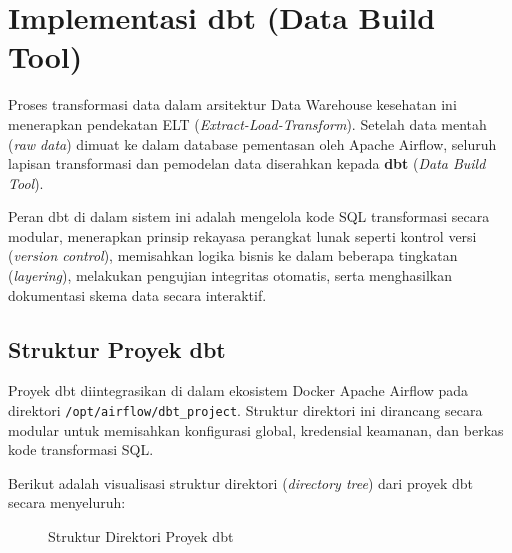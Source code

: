 
\chapter{Implementasi dbt (Data Build Tool)}
 
 
Proses transformasi data dalam arsitektur Data Warehouse kesehatan ini menerapkan pendekatan ELT (\textit{Extract-Load-Transform}). Setelah data mentah (\textit{raw data}) dimuat ke dalam database pementasan oleh Apache Airflow, seluruh lapisan transformasi dan pemodelan data diserahkan kepada \textbf{dbt} (\textit{Data Build Tool}).
 
Peran dbt di dalam sistem ini adalah mengelola kode SQL transformasi secara modular, menerapkan prinsip rekayasa perangkat lunak seperti kontrol versi (\textit{version control}), memisahkan logika bisnis ke dalam beberapa tingkatan (\textit{layering}), melakukan pengujian integritas otomatis, serta menghasilkan dokumentasi skema data secara interaktif.
 
\section{Struktur Proyek dbt}
 
Proyek dbt diintegrasikan di dalam ekosistem Docker Apache Airflow pada direktori \texttt{/opt/airflow/dbt\_project}. Struktur direktori ini dirancang secara modular untuk memisahkan konfigurasi global, kredensial keamanan, dan berkas kode transformasi SQL.
 
Berikut adalah visualisasi struktur direktori (\textit{directory tree}) dari proyek dbt secara menyeluruh:
 
\begin{figure}[H]
\caption{Struktur Direktori Proyek dbt}
\label{fig:dbt_dirtree}
\end{figure}
 
